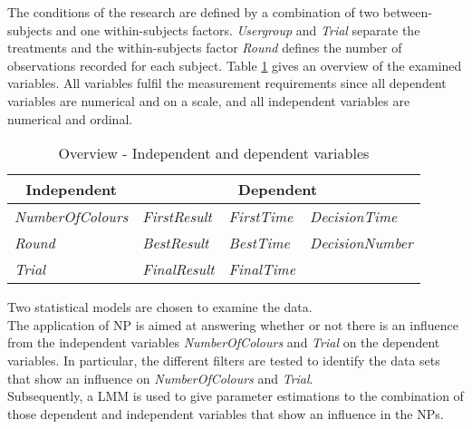 The conditions of the research are defined by a combination of two between-subjects and one within-subjects factors. \textit{Usergroup} and \textit{Trial} separate the treatments and the within-subjects factor \textit{Round} defines the number of observations recorded for each subject.
Table \ref{tab:OverviewVariables} gives an overview of the examined variables. All variables fulfil the measurement requirements since all dependent variables are numerical and on a scale, and all independent variables are numerical and ordinal. \\
\begin{table}
  \centering
    \begin{tabular}{l|lll}
    \toprule
    \multicolumn{1}{c|}{Independent}  & \multicolumn{3}{c}{Dependent} \\
    \midrule
    \textit{NumberOfColours} & \textit{FirstResult} & \textit{FirstTime} & \textit{DecisionTime}\\
    \textit{Round} & \textit{BestResult} & \textit{BestTime} & \textit{DecisionNumber}\\
    \textit{Trial} & \textit{FinalResult} & \textit{FinalTime}\\
    \bottomrule
    \end{tabular}%
      \caption{Overview - Independent and dependent variables}
    \label{tab:OverviewVariables}%
\end{table}%

Two statistical models are chosen to examine the data.\\
The application of \acf{NP} is aimed at answering whether or not there is an influence from the independent variables \textit{NumberOfColours} and \textit{Trial} on the dependent variables. In particular, the different filters are tested to identify the data sets that show an influence on \textit{NumberOfColours} and \textit{Trial}.\\
Subsequently, a \acf{LMM} is used to give parameter estimations to the combination of those dependent and independent variables that show an influence in the \ac{NP}s.



